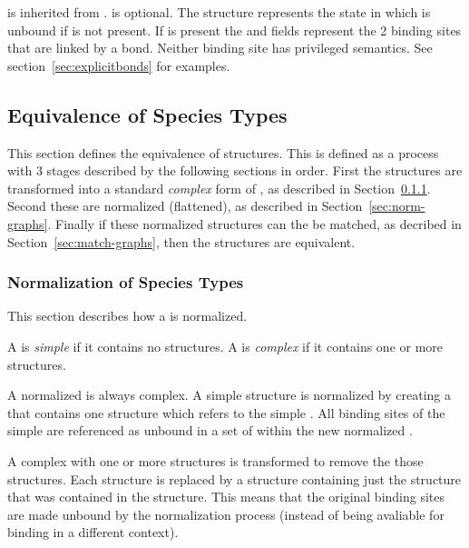 \documentclass{cekarticle}
\begin{document}
 is inherited from .
 is optional.
The  structure represents the state in which  is unbound if
 is not present.
If  is present the  and
 fields represent the 2 binding sites that are linked by a bond.
Neither binding site has privileged semantics.
See section~\ref{sec:explicitbonds} for examples.

\subsection{Equivalence of Species Types}

\label{sec:type-equals}

This section defines the equivalence of  structures.
This is defined as a process with 3 stages described by the following 
sections in order.  First the  structures are transformed into a
standard \emph{complex} form of , as described in Section~\ref{sec:trans-type}.
Second these 
are normalized (flattened), as described in Section~\ref{sec:norm-graphs}.
Finally if these normalized structures can the be
matched, as decribed in Section~\ref{sec:match-graphs},
then the  structures are equivalent. 

\subsubsection{Normalization of Species Types}
\label{sec:trans-type}

This section describes how a  is normalized.

A  is \emph{simple} if it contains no  structures.
A  is \emph{complex} if it contains one or more  structures.

A normalized  is always complex.
A simple  structure is normalized by creating a 
that contains one  structure which refers to the simple .
All binding sites of the simple  are referenced as unbound in a set of
 within the new normalized .

A complex  with one or more  structures is transformed
to remove the those structures.  Each  structure is replaced by a
 structure containing just the  structure
that was contained in the  structure.  This means that the original
binding sites are made unbound by the normalization process
(instead of being avaliable for binding in a different context).
\end{document}
